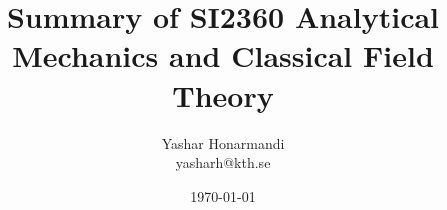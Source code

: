 \documentclass[a4paper, 11pt]{article}
\title{Summary of SI2360 Analytical Mechanics and Classical Field Theory}
\author{Yashar Honarmandi \\ yasharh@kth.se}
\date{\today}
\begin{document}
\maketitle

\begin{abstract}
	
\end{abstract}

\thispagestyle{empty}

\newpage

\tableofcontents

\newpage



















\end{document}
